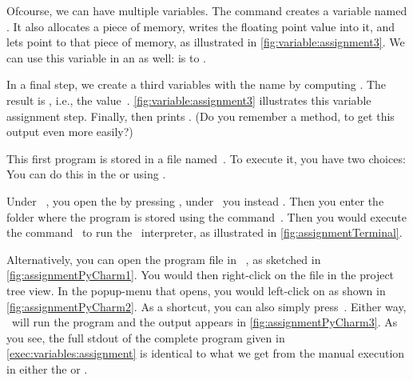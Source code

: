 Ofcourse, we can have multiple variables.
The command  creates a variable named .
It also allocates a piece of memory, writes the floating point value  into it, and lets  point to that piece of memory, as illustrated in \cref{fig:variable:assignment3}.
We can use this variable in an  as well:
 is  to .%
%
\begin{sloppypar}%
In a final step, we create a third variables with the name  by computing .
The result is , i.e., the  value~.
\cref{fig:variable:assignment3} illustrates this variable assignment step.
Finally,  then prints .
(Do you remember a method, to get this output even more easily?)%
\end{sloppypar}%
%
This first program is stored in a file named~.
To execute it, you have two choices:
You can do this in the  or using \pycharm.%
%
\begin{sloppypar}%
Under \ubuntu\ \linux, you open the  by pressing \ubuntuTerminal, under \microsoftWindows\ you instead \windowsTerminal.
Then you enter the folder where the program  is stored using the command~.
Then you would execute the command~ to run the \python\ interpreter, as illustrated in \cref{fig:assignmentTerminal}.%
\end{sloppypar}%
%
Alternatively, you can open the program file in \pycharm\ , as sketched in \cref{fig:assignmentPyCharm1}.
You would then right-click on the file  in the project tree view.
In the popup-menu that opens, you would left-click on  as shown in \cref{fig:assignmentPyCharm2}.
As a shortcut, you can also simply press~.
Either way, \pycharm\ will run the program and the output appears in \cref{fig:assignmentPyCharm3}.
As you see, the full \acrfull{stdout} of the complete program given in \cref{exec:variables:assignment} is identical to what we get from the manual execution in either the  or \pycharm.


